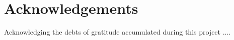 \chapter*{Acknowledgements}
    \setlength{\parskip}{1cm}
    Acknowledging the debts of gratitude accumulated during this project ....
    \setlength{\parskip}{\originalparskip}
